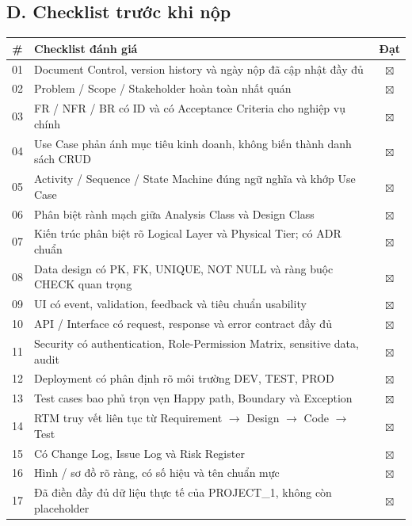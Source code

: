 \documentclass[11pt,a4paper]{article}
\begin{document}
\subsection*{D. Checklist trước khi nộp}
\begin{table}[H]
    \centering
    \small
    \begin{tabularx}{\textwidth}{|c|X|c|}
        \hline
        \textbf{\#} & \textbf{Checklist đánh giá} & \textbf{Đạt} \\ \hline
        01 & Document Control, version history và ngày nộp đã cập nhật đầy đủ & $\boxtimes$ \\ \hline
        02 & Problem / Scope / Stakeholder hoàn toàn nhất quán & $\boxtimes$ \\ \hline
        03 & FR / NFR / BR có ID và có Acceptance Criteria cho nghiệp vụ chính & $\boxtimes$ \\ \hline
        04 & Use Case phản ánh mục tiêu kinh doanh, không biến thành danh sách CRUD & $\boxtimes$ \\ \hline
        05 & Activity / Sequence / State Machine đúng ngữ nghĩa và khớp Use Case & $\boxtimes$ \\ \hline
        06 & Phân biệt rành mạch giữa Analysis Class và Design Class & $\boxtimes$ \\ \hline
        07 & Kiến trúc phân biệt rõ Logical Layer và Physical Tier; có ADR chuẩn & $\boxtimes$ \\ \hline
        08 & Data design có PK, FK, UNIQUE, NOT NULL và ràng buộc CHECK quan trọng & $\boxtimes$ \\ \hline
        09 & UI có event, validation, feedback và tiêu chuẩn usability & $\boxtimes$ \\ \hline
        10 & API / Interface có request, response và error contract đầy đủ & $\boxtimes$ \\ \hline
        11 & Security có authentication, Role-Permission Matrix, sensitive data, audit & $\boxtimes$ \\ \hline
        12 & Deployment có phân định rõ môi trường DEV, TEST, PROD & $\boxtimes$ \\ \hline
        13 & Test cases bao phủ trọn vẹn Happy path, Boundary và Exception & $\boxtimes$ \\ \hline
        14 & RTM truy vết liên tục từ Requirement $\rightarrow$ Design $\rightarrow$ Code $\rightarrow$ Test & $\boxtimes$ \\ \hline
        15 & Có Change Log, Issue Log và Risk Register & $\boxtimes$ \\ \hline
        16 & Hình / sơ đồ rõ ràng, có số hiệu và tên chuẩn mực & $\boxtimes$ \\ \hline
        17 & Đã điền đầy đủ dữ liệu thực tế của PROJECT\_1, không còn placeholder & $\boxtimes$ \\ \hline
    \end{tabularx}
\end{table}
\end{document}
